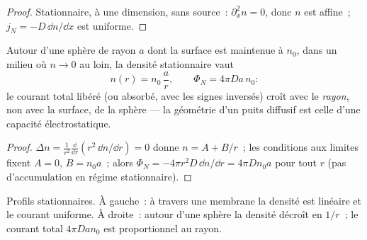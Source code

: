 \begin{proof}
Stationnaire, à une dimension, sans source~: $\partial_x^2 n = 0$, donc $n$ est
affine~; $j_N = -D\,\dd n/\dd x$ est uniforme.
\end{proof}

\begin{proposition}\label{prop:b2:particle-diffusion:sphere}
Autour d'une sphère de rayon $a$ dont la surface est maintenue à $n_0$, dans un
milieu où $n \to 0$ au loin, la densité stationnaire vaut
\[
n(r) = n_0\,\frac{a}{r}, \qquad
\Phi_N = 4\pi D a\,n_0 :
\]
le courant total libéré (ou absorbé, avec les signes inversés) croît
avec le \emph{rayon}, non avec la surface, de la sphère --- la
géométrie d'un puits diffusif est celle d'une capacité électrostatique.
\end{proposition}

\begin{proof}
$\Delta n = \frac{1}{r^2}\frac{\dd}{\dd r}(r^2\,\dd n/\dd r) = 0$ donne
$n = A + B/r$~; les conditions aux limites fixent $A = 0$, $B = n_0 a$~; alors
$\Phi_N = -4\pi r^2 D\,\dd n/\dd r = 4\pi D n_0 a$ pour tout $r$ (pas
d'accumulation en régime stationnaire).
\end{proof}

\begin{omfigure}

{\small Profils stationnaires. À gauche~: à travers une membrane la densité est
linéaire et le courant uniforme. À droite~: autour d'une sphère la densité
décroît en $1/r$~; le courant total $4\pi D a n_0$ est proportionnel au
rayon.}
\end{omfigure}

